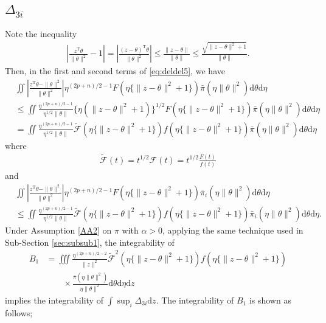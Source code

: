 \documentclass[preprint,11pt]{imsart}
\numberwithin{equation}{section}
\theoremstyle{plain}
\theoremstyle{definition}
\theoremstyle{remark}
\def\T{{ \mathrm{\scriptscriptstyle T} }}
\newcommand{\rd}{\mathrm{d}}
\begin{document}
  \subsection{$\Delta_{3i}$}
\label{sec:delta45}
  Note the inequality
 \begin{align*}
\left|\frac{z^\T\theta}{\|\theta\|^2} -1 \right|
=\left|\frac{(z-\theta)^\T\theta}{\|\theta\|^2}  \right|
\leq \frac{\|z-\theta\|}{\|\theta\|} 
\leq \frac{\sqrt{\|z-\theta\|^2+1}}{\|\theta\|}.
 \end{align*}
Then, in the first and second terms of \eqref{eq:deldel5}, we have
\begin{align*}
  &\iint  \left|\frac{z^\T\theta-\|\theta\|^2}{\|\theta\|^2}\right| \eta^{(2p+n)/2-1} F(\eta\{\|z-\theta\|^2+1\})
 \bar{\pi}(\eta\|\theta\|^2) \rd \theta   \rd \eta \\
 &\leq
 \iint \frac{\eta^{(2p+n)/2-1}}{\eta^{1/2}\|\theta\|}
\{\eta(\|z-\theta\|^2+1)\}^{1/2}F(\eta\{\|z-\theta\|^2+1\})
 \bar{\pi}(\eta\|\theta\|^2) \rd \theta   \rd \eta \\
 &=
 \iint \frac{\eta^{(2p+n)/2-1}}{\eta^{1/2}\|\theta\|}
 \tilde{\mathcal{F}}(\eta\{\|z-\theta\|^2+1\})f(\eta\{\|z-\theta\|^2+1\})
 \bar{\pi}(\eta\|\theta\|^2) \rd \theta   \rd \eta
\end{align*}
where
\begin{align*}
 \tilde{\mathcal{F}}(t)=t^{1/2}\mathcal{F}(t)=t^{1/2}\frac{F(t)}{f(t)}
\end{align*}
and
\begin{align*}
  &\iint  \left|\frac{z^\T\theta-\|\theta\|^2}{\|\theta\|^2}\right| \eta^{(2p+n)/2-1} F(\eta\{\|z-\theta\|^2+1\})
 \bar{\pi}_i(\eta\|\theta\|^2) \rd \theta   \rd \eta \\
 &\leq
 \iint \frac{\eta^{(2p+n)/2-1}}{\eta^{1/2}\|\theta\|}
 \tilde{\mathcal{F}}(\eta\{\|z-\theta\|^2+1\}) f(\eta\{\|z-\theta\|^2+1\})
 \bar{\pi}_i(\eta\|\theta\|^2) \rd \theta   \rd \eta.
\end{align*}
Under Assumption \ref{AA2} on $\pi$ with $\alpha>0$,
applying the same technique used in Sub-Section \ref{sec:subsub1},
the integrability of
\begin{align*}
B_1 & =\iiint \frac{\eta^{(2p+n)/2-2}}{\|z\|^2}   \tilde{\mathcal{F}}^2(\eta\{\|z-\theta\|^2+1\})
 f(\eta\{\|z-\theta\|^2+1\}) \\
&\qquad \times \frac{\bar{\pi}(\eta\|\theta\|^2)}{\eta\|\theta\|^2}
 \rd \theta   \rd \eta  \rd z 
\end{align*}
implies the integrability of $ \int  \sup_i\Delta_{3i}\rd z$. 
The integrability of $B_1$ is shown as follows;
\end{document}
